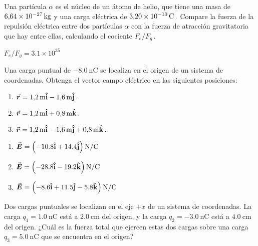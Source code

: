 \setcounter{figure}{0}

\begin{Exercise}
  Una partícula $\alpha$ es el núcleo de un átomo de helio, que tiene una masa de $\SI{6.64E-27}{\kilogram}$ y una carga eléctrica de $\SI{3.20E-19}{\coulomb}\,.$ Compare la fuerza de la repulsión eléctrica entre dos partículas $\alpha$ con la fuerza de atracción gravitatoria que hay entre ellas, calculando el cociente $F_e/F_g\,.$
\end{Exercise}
\begin{Answer}
  $F_e/F_g = 3.1\times 10^{35}$
\end{Answer}
%
\begin{Exercise}
  Una carga puntual de $\SI{-8.0}{\nano\coulomb}$ se localiza en el origen de un sistema de coordenadas. Obtenga el vector campo eléctrico en las siguientes posiciones:
  \begin{enumerate}[label=(\roman*)]
    \item $\va*{r} = \SI{1.2}{\metre}\vu{i} - \SI{1.6}{\metre}\vu{j}\,.$\par
    \item $\va*{r} = \SI{1.2}{\metre}\vu{i} + \SI{0.8}{\metre}\vu{k}\,.$\par
    \item $\va*{r} = \SI{1.2}{\metre}\vu{i} - \SI{1.6}{\metre}\vu{j} + \SI{0.8}{\metre}\vu{k}\,.$
  \end{enumerate}
\end{Exercise}
\begin{Answer}
  \begin{minipage}[t]{.5\textwidth}
    \begin{enumerate}[label=(\roman*)]
      \item $\va*{E} = \left ( -10.8\vu{i} + 14.4\vu{j}\right )\si{N/C}$\\
      \item $\va*{E} = \left ( -28.8\vu{i}  -19.2\vu{k}\right )\si{N/C}$\\
      \item  $\va*{E} = \left ( -8.6\vu{i} + 11.5\vu{j} - 5.8\vu{k}\right )\si{N/C}$
  \end{enumerate}
\end{minipage}


\end{Answer}
%
\begin{Exercise}
Dos cargas puntuales se localizan en el eje $+x$ de un sistema de coordenadas. La carga $q_1 = \SI{1.0}{\nano\coulomb}$ está a $\SI{2.0}{\centi\metre}$ del origen, y la carga $q_2 = \SI{-3.0}{\nano\coulomb}$ está a $\SI{4.0}{\centi\metre}$ del origen. ¿Cuál es la fuerza total que ejercen estas dos cargas sobre una carga $q_3 = \SI{5.0}{\nano\coulomb}$ que se encuentra en el origen?
\end{Exercise}
